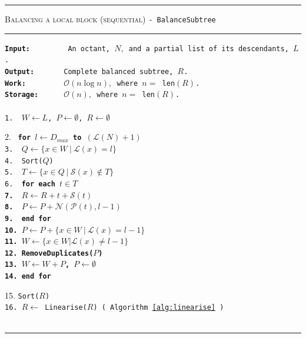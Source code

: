 \begin{table} 
\centering
\rule{\textwidth}{0.01mm}
\begin{algorithm}{ \textsc{Balancing a local block (sequential)} \tt{- BalanceSubtree}}
\rule{\textwidth}{0.01mm}
\flushleft
\tt{\bf{Input:~~~~~~~~}} An octant, $N,$ and a partial list of its descendants, $L$.\\
  \tt{\bf{Output:~~~~~~}} Complete balanced subtree, $R$.\\
  \tt{\bf{Work:~~~~~~~~}} $\mathcal{O}(n\log n),$ where $n = $ len$(R)$.\\
  \tt{\bf{Storage:~~~~~}} $\mathcal{O}(n),$ where $n = $ len$(R)$.\\
~\\
1.~ \tt{$W \leftarrow L$, $P \leftarrow \emptyset$, $R \leftarrow \emptyset$}\\
\begin{tabbing}
2.~  \tt{\bf for} \= \tt{$l \leftarrow D_{max}$ \bf{to} $(\mathcal{L}(N)+1)$}\\
3.~\> \tt{$Q \leftarrow \{x \in W ~|~ \mathcal{L}(x) = l\}$}\\       
4.~ \> \tt{Sort($Q$)}\\ 
5.~ \> \tt{$T \leftarrow \{x \in Q ~|~ \mathcal{S}(x) \notin T\}$}\\      
6.~      \> \tt{\bf for} \=\bf{each} {$t \in T$}\\
7.~      \> \> $R \leftarrow R + t + \mathcal{S}(t)$\\
8.~      \> \> $P \leftarrow P + \mathcal{N}\left(\mathcal{P}(t),l-1\right)$\\
9.~			\> \tt{\bf{end for}}\\
10.       \> $P \leftarrow P + \{x \in W ~|~ \mathcal{L}(x) = l-1\}$ \\ 		    
11.       \> $W \leftarrow \{x \in W | \mathcal{L}(x) \neq l-1\}$ \\
12. \> \tt{RemoveDuplicates($P$)}\\
13.      \> $W \leftarrow W + P$,  $P \leftarrow \emptyset$\\
14. \tt{\bf{end for}}
\end{tabbing}
15. \tt{Sort($R$)}\\
16. $R \leftarrow$ Linearise($R$) ( Algorithm \ref{alg:linearise} )\\ 
\label{alg:effConBal}
\end{algorithm}
\rule{\textwidth}{0.01mm}
\end{table}

